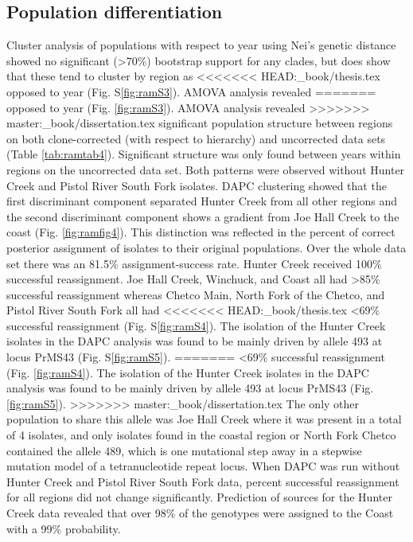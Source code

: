 \documentclass[double,12pt]{beavtex}
\begin{document}
  \subsection{Population
  differentiation}\label{population-differentiation}
  
  Cluster analysis of populations with respect to year using Nei's genetic
  distance showed no significant (\textgreater{}70\%) bootstrap support
  for any clades, but does show that these tend to cluster by region as
<<<<<<< HEAD:_book/thesis.tex
  opposed to year (Fig. S\ref{fig:ramS3}). AMOVA analysis revealed
=======
  opposed to year (Fig. \ref{fig:ramS3}). AMOVA analysis revealed
>>>>>>> master:_book/dissertation.tex
  significant population structure between regions on both clone-corrected
  (with respect to hierarchy) and uncorrected data sets (Table
  \ref{tab:ramtab4}). Significant structure was only found between years
  within regions on the uncorrected data set. Both patterns were observed
  without Hunter Creek and Pistol River South Fork isolates. DAPC
  clustering showed that the first discriminant component separated Hunter
  Creek from all other regions and the second discriminant component shows
  a gradient from Joe Hall Creek to the coast (Fig. \ref{fig:ramfig4}).
  This distinction was reflected in the percent of correct posterior
  assignment of isolates to their original populations. Over the whole
  data set there was an 81.5\% assignment-success rate. Hunter Creek
  received 100\% successful reassignment. Joe Hall Creek, Winchuck, and
  Coast all had \textgreater{}85\% successful reassignment whereas Chetco
  Main, North Fork of the Chetco, and Pistol River South Fork all had
<<<<<<< HEAD:_book/thesis.tex
  \textless{}69\% successful reassignment (Fig. S\ref{fig:ramS4}). The
  isolation of the Hunter Creek isolates in the DAPC analysis was found to
  be mainly driven by allele 493 at locus PrMS43 (Fig. S\ref{fig:ramS5}).
=======
  \textless{}69\% successful reassignment (Fig. \ref{fig:ramS4}). The
  isolation of the Hunter Creek isolates in the DAPC analysis was found to
  be mainly driven by allele 493 at locus PrMS43 (Fig. \ref{fig:ramS5}).
>>>>>>> master:_book/dissertation.tex
  The only other population to share this allele was Joe Hall Creek where
  it was present in a total of 4 isolates, and only isolates found in the
  coastal region or North Fork Chetco contained the allele 489, which is
  one mutational step away in a stepwise mutation model of a
  tetranucleotide repeat locus. When DAPC was run without Hunter Creek and
  Pistol River South Fork data, percent successful reassignment for all
  regions did not change significantly. Prediction of sources for the
  Hunter Creek data revealed that over 98\% of the genotypes were assigned
  to the Coast with a 99\% probability.
  
\end{document}
